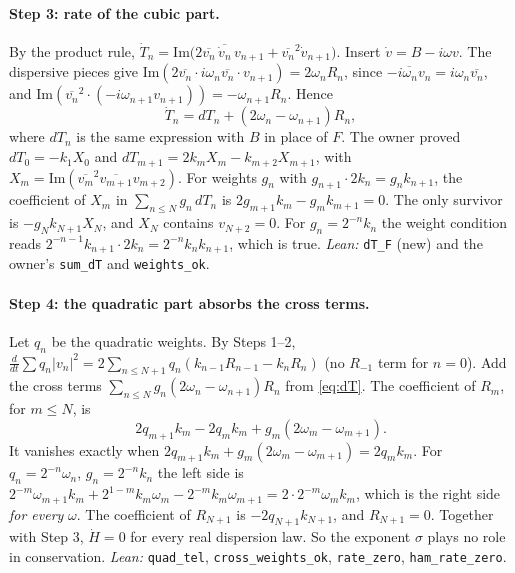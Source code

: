 \documentclass[11pt]{article}
\newcommand{\leanst}[1]{}
\theoremstyle{remark}
\newcommand{\lean}[1]{\texttt{#1}}
\newcommand{\cj}[1]{\overline{#1}}
\begin{document}
\paragraph{Step 3: rate of the cubic part.} By the product rule,
$\dot T_n=\mathrm{Im}\big(2\cj{v_n}\,\cj{\dot v_n}\,v_{n+1}+\cj{v_n}^2\dot v_{n+1}\big)$. Insert $\dot v=B-i\omega v$.
The dispersive pieces give $\mathrm{Im}(2\cj{v_n}\cdot i\omega_n\cj{v_n}\cdot v_{n+1})=2\omega_nR_n$, since
$\cj{-i\omega_nv_n}=i\omega_n\cj{v_n}$, and $\mathrm{Im}(\cj{v_n}^2\cdot(-i\omega_{n+1}v_{n+1}))=-\omega_{n+1}R_n$. Hence
\begin{equation}\label{eq:dT}
\dot T_n = dT_n + (2\omega_n-\omega_{n+1})R_n ,
\end{equation}
where $dT_n$ is the same expression with $B$ in place of $F$. The owner proved
$dT_0=-k_1X_0$ and $dT_{m+1}=2k_mX_m-k_{m+2}X_{m+1}$, with $X_m=\mathrm{Im}(\cj{v_m}^2\cj{v_{m+1}}v_{m+2})$. For weights
$g_n$ with $g_{n+1}\cdot2k_n=g_nk_{n+1}$, the coefficient of $X_m$ in $\sum_{n\le N}g_n\,dT_n$ is
$2g_{m+1}k_m-g_mk_{m+1}=0$. The only survivor is $-g_Nk_{N+1}X_N$, and $X_N$ contains $v_{N+2}=0$. For $g_n=2^{-n}k_n$ the weight
condition reads $2^{-n-1}k_{n+1}\cdot2k_n=2^{-n}k_nk_{n+1}$, which is true. \emph{Lean:} \lean{dT\_F} (new) and the owner's
\lean{sum\_dT} and \lean{weights\_ok}.
\leanst{dT_F}\leanst{weights_ok}

\paragraph{Step 4: the quadratic part absorbs the cross terms.} Let $q_n$ be the quadratic weights. By Steps 1--2,
$\frac{d}{dt}\sum q_n|v_n|^2=2\sum_{n\le N+1}q_n(k_{n-1}R_{n-1}-k_nR_n)$ (no $R_{-1}$ term for $n=0$). Add the cross terms
$\sum_{n\le N}g_n(2\omega_n-\omega_{n+1})R_n$ from \eqref{eq:dT}. The coefficient of $R_m$, for $m\le N$, is
\[
2q_{m+1}k_m-2q_mk_m+g_m(2\omega_m-\omega_{m+1}).
\]
It vanishes exactly when $2q_{m+1}k_m+g_m(2\omega_m-\omega_{m+1})=2q_mk_m$. For $q_n=2^{-n}\omega_n$, $g_n=2^{-n}k_n$
the left side is $2^{-m}\omega_{m+1}k_m+2^{1-m}k_m\omega_m-2^{-m}k_m\omega_{m+1}=2\cdot2^{-m}\omega_mk_m$, which is the
right side \emph{for every} $\omega$. The coefficient of $R_{N+1}$ is $-2q_{N+1}k_{N+1}$, and $R_{N+1}=0$. Together with
Step 3, $\dot H=0$ for every real dispersion law. So the exponent $\sigma$ plays no role in conservation. \emph{Lean:}
\lean{quad\_tel}, \lean{cross\_weights\_ok}, \lean{rate\_zero}, \lean{ham\_rate\_zero}.
\leanst{quad_tel}\leanst{cross_weights_ok}\leanst{rate_zero}\leanst{ham_rate_zero}
\end{document}
